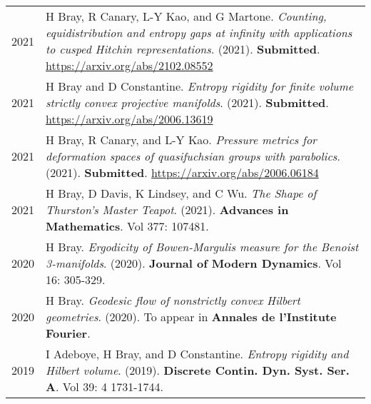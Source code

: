 
    \medskip


    \medskip
    
    \begin{center}
    {
    \renewcommand{\arraystretch}{1.5}
    \begin{longtable}{p{}  p{}}
    
2021 & 
        H Bray, R Canary, L-Y Kao, and G Martone. \textit{Counting, equidistribution and entropy gaps at infinity with applications to cusped Hitchin representations}. (2021). 
         \textbf{Submitted}. \url{https://arxiv.org/abs/2102.08552}\\ 

2021 & 
        H Bray and D Constantine. \textit{Entropy rigidity for finite volume strictly convex projective manifolds}. (2021). 
         \textbf{Submitted}. \url{https://arxiv.org/abs/2006.13619}\\ 

2021 & 
        H Bray, R Canary, and L-Y Kao. \textit{Pressure metrics for deformation spaces of quasifuchsian groups with parabolics}. (2021). 
         \textbf{Submitted}. \url{https://arxiv.org/abs/2006.06184}\\ 

2021 & 
        H Bray, D Davis, K Lindsey, and C Wu. \textit{The Shape of Thurston's Master Teapot}. (2021). 
        \textbf{Advances in Mathematics}. Vol 377: 107481.\\ 

2020 & 
        H Bray. \textit{Ergodicity of Bowen-Margulis measure for the Benoist 3-manifolds}. (2020). 
        \textbf{Journal of Modern Dynamics}. Vol 16:  305-329.\\ 

2020 & 
        H Bray. \textit{Geodesic flow of nonstrictly convex Hilbert geometries}. (2020). 
        To appear in \textbf{Annales de l'Institute Fourier}.\\ 

2019 & 
        I Adeboye, H Bray, and D Constantine. \textit{Entropy rigidity and Hilbert volume}. (2019). 
        \textbf{Discrete Contin. Dyn. Syst. Ser. A}. Vol 39: 4 1731-1744.
    \end{longtable}
    } 
    \end{center}

    \vspace{-1em}
    